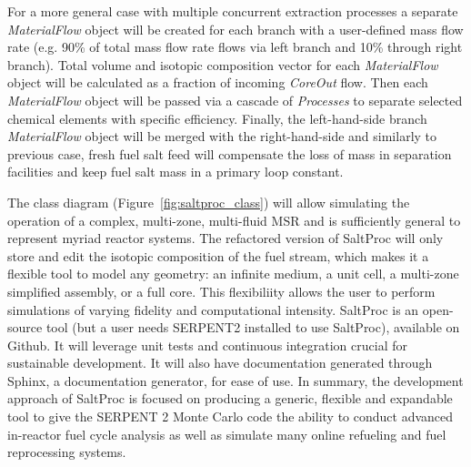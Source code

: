 For a more general case with multiple concurrent extraction processes a separate 
\textit{MaterialFlow} object will be created for each branch with a user-defined 
mass flow rate (e.g. 90\% of total mass flow rate flows via left branch and 
10\% through right branch). Total volume and isotopic composition vector 
for each \textit{MaterialFlow} object will be calculated as a fraction of incoming 
\textit{CoreOut} flow. Then each \textit{MaterialFlow} object will be passed via 
a cascade of \textit{Processes} to separate selected chemical elements with 
specific efficiency. Finally, the left-hand-side branch \textit{MaterialFlow} object 
will be merged with the right-hand-side and similarly to previous case, fresh 
fuel salt feed will compensate the loss of mass in separation facilities and keep 
fuel salt mass in a primary loop constant.

The class diagram (Figure~\ref{fig:saltproc_class}) will allow simulating 
the operation of a complex, multi-zone, 
multi-fluid \gls{MSR} and is sufficiently general to represent myriad reactor 
systems. The refactored version of SaltProc will only store and edit the 
isotopic composition of the fuel stream, which makes it a flexible tool to 
model any geometry: an infinite medium, a unit cell, a multi-zone simplified 
assembly, or a full core. This flexibiliity allows the user to perform 
simulations of varying fidelity and computational intensity. SaltProc is an 
open-source tool (but a user needs SERPENT2 installed to use SaltProc), 
available on Github. It will leverage unit tests and continuous integration 
crucial for sustainable development. It will also have documentation
generated through Sphinx, a documentation generator, for ease of use. In summary, the 
development approach of SaltProc is focused on producing a generic, flexible and 
expandable tool to give the SERPENT 2 Monte Carlo code the ability to conduct 
advanced in-reactor fuel cycle analysis as well as simulate many 
online refueling and fuel reprocessing systems.


